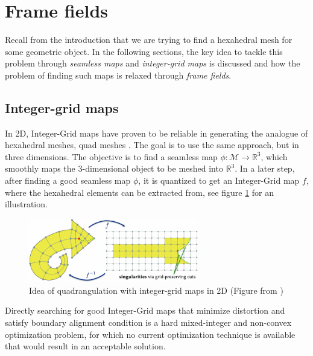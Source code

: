 \documentclass[../thesis.tex]{subfiles}
\begin{document}
\section{Frame fields}
Recall from the introduction that we are trying to find a hexahedral mesh
for some geometric object. In the following sections, the key idea to
tackle this problem through \emph{seamless maps} and \emph{integer-grid maps} is discussed and
how the problem of finding such maps is relaxed through \emph{frame fields}.
\subsection{Integer-grid maps}

In 2D, Integer-Grid maps have proven to be reliable
in generating the analogue of hexahedral meshes, quad meshes \cite{integer-grid}.
The goal is to use the same approach, but in three dimensions.
The objective is to find a seamless map
$\phi : \mathcal{M} \to \mathbb{R}^3$, which smoothly maps the $3$-dimensional object
to be meshed into $\mathbb{R}^3$.
In a later step, after finding a good seamless map $\phi$, it is quantized to get an
Integer-Grid map $f$, where the hexahedral elements can be extracted from,  see figure \ref{fig:integer-grid} for an illustration.
\begin{figure}[htb]
  \centering
  \includegraphics[width=20em]{figures/integer-grid-rough}
  \caption{Idea of quadrangulation with integer-grid maps in 2D (Figure from \cite{Hex22})}
  \label{fig:integer-grid}
\end{figure}
Directly searching for good Integer-Grid maps that minimize distortion and satisfy boundary alignment
condition is a hard mixed-integer and non-convex optimization problem, for which no current
optimization technique is available that would result in an acceptable solution.
\end{document}
